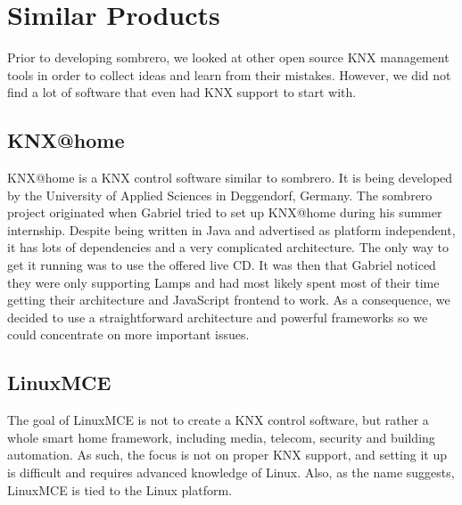 \section{Similar Products}

Prior to developing sombrero, we looked at other open source KNX management tools in order to collect ideas and learn from their mistakes. However, we did not find a lot of software that even had KNX support to start with.


\subsection{KNX@home}

KNX@home is a KNX control software similar to sombrero. It is being developed by the University of Applied Sciences in Deggendorf, Germany. The sombrero project originated when Gabriel tried to set up KNX@home during his summer internship. Despite being written in Java and advertised as platform independent, it has lots of dependencies and a very complicated architecture. The only way to get it running was to use the offered live CD. It was then that Gabriel noticed they were only supporting Lamps and had most likely spent most of their time getting their architecture and JavaScript frontend to work. As a consequence, we decided to use a straightforward architecture and powerful frameworks so we could concentrate on more important issues.


\subsection{LinuxMCE}

The goal of LinuxMCE is not to create a KNX control software, but rather a whole smart home framework, including media, telecom, security and building automation. As such, the focus is not on proper KNX support, and setting it up is difficult and requires advanced knowledge of Linux. Also, as the name suggests, LinuxMCE is tied to the Linux platform.
